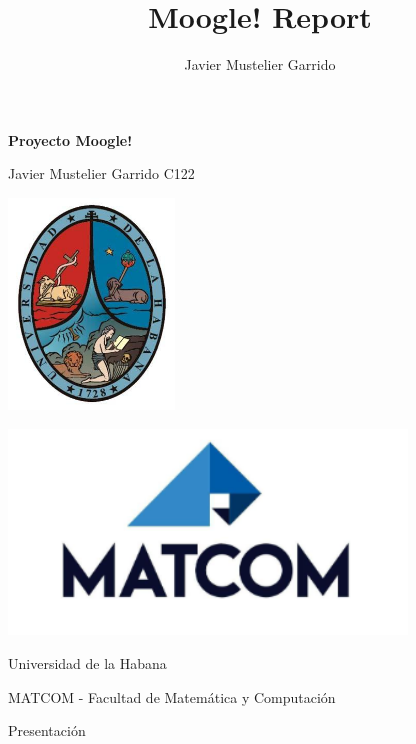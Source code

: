 \documentclass[10pt]{article}
\title{Moogle! Report}
\author{Javier Mustelier Garrido}
\begin{document}
\addtocounter{page}{-2} 

\begingroup %

\begin{center}
	\thispagestyle{empty}
	
	\fontsize{35}{0}
	\bfseries Proyecto Moogle!

	\vspace{1cm}
	
	\Large Javier Mustelier Garrido C122 

	\vspace{2cm}

	\includegraphics[width=125pt]{../assets/uh.jpeg}

	\vspace{2cm}

	\includegraphics[width=300pt]{../assets/matcom.png}

	\vspace{2cm}

	Universidad de la Habana 
	
	\large{ MATCOM - Facultad de Matemática y Computación }
	
\end{center}
\endgroup

\begin{center} \huge {Presentación} \normalsize \end{center}
\thispagestyle{empty}
\end{document}

